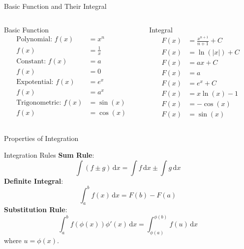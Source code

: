 \documentclass[10pt, aspectratio=1610]{beamer}
\begin{document}
\begin{frame}{Basic Function and Their Integral}
  \begin{columns}
    \begin{column}{0.5\textwidth}
      \begin{block}{Basic Function}
        \begin{align*}
        \text{Polynomial}:\,f(x) &= x^{n}\\
        f(x) &= \frac{1}{x}\\
        \text{Constant}:\, f(x) &=a\\
        f(x) &=0\\
        \text{Expotential}:\, f(x) &= e^{x}\\
        f(x) &=a^{x}\\
        \text{Trigonometric}:\, f(x) &=\sin{(x)}\\
        f(x) &=\cos{(x)}
      \end{align*}
    \end{block}
  \end{column}
 
  \begin{column}{0.5\textwidth}
    \begin{block}{Integral}
      \begin{align*}
      F(x) &= \frac{x^{n+1}}{n+1}+C\\
      F(x) &= \ln{(\lvert x \rvert)}+C\\
      F(x) &=ax+C\\
      F(x) &=a\\
      F(x) &= e^{x}+C\\
      F(x) &= x\ln{(x)-1}\\
      F(x) &=-\cos{(x)}\\
      F(x) &= \sin{(x)}
      \end{align*}
    \end{block}
  \end{column}
\end{columns}
\end{frame}

\begin{frame}{Properties of Integration}
  \begin{block}{Integration Rules}
    \textbf{Sum Rule}: 
    \[\int (f\pm g)\,\mathrm{d}x = \int f\,\mathrm{d}x\pm \int g\,\mathrm{d}x\]
    \textbf{Definite Integral}: 
    \[\int_{a}^b f(x)\,\mathrm{d}x=F(b)-F(a)\]
    \textbf{Substitution Rule}: 
    \[\int_{a}^{b} f(\phi(x))\phi'(x)\,\mathrm{d}x = \int_{\phi(a)}^{\phi(b)} f(u)\,\mathrm{d}x\]
    where $u=\phi(x)$.
    \end{block}
\end{frame}
\end{document}
